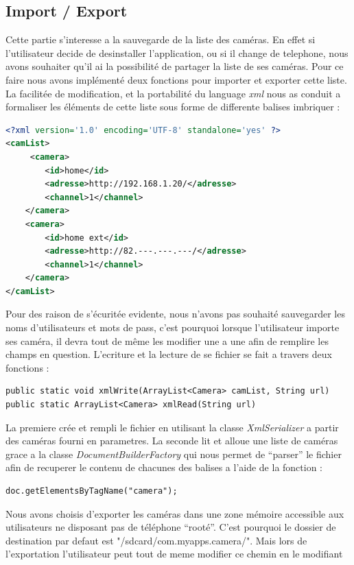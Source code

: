 \subsection{Import / Export}
Cette partie s'interesse a la sauvegarde de la liste des caméras. En effet si
l'utilisateur decide de desinstaller l'application, ou si il change de
telephone, nous avons souhaiter qu'il ai la possibilité de partager la liste de
ses caméras. Pour ce faire nous avons implémenté deux fonctions pour importer et
exporter cette liste.\newline
La facilitée de modification, et la portabilité du language \textit{xml} nous as
conduit a formaliser les éléments de cette liste sous forme de differente
balises imbriquer :
\begin{lstlisting}[language=XML, format=XML]
<?xml version='1.0' encoding='UTF-8' standalone='yes' ?> 
<camList>
   	 <camera> 
   		<id>home</id>
  		<adresse>http://192.168.1.20/</adresse> 
  		<channel>1</channel> 
  	</camera> 
  	<camera> 
   		<id>home ext</id>
  		<adresse>http://82.---.---.---/</adresse> 
  		<channel>1</channel> 
  	</camera> 
</camList>
\end{lstlisting}
Pour des raison de s'écuritée evidente, nous n'avons pas souhaité sauvegarder
les noms d'utilisateurs et mots de pass, c'est pourquoi lorsque l'utilisateur
importe ses caméra, il devra tout de même les modifier une a une afin de
remplire les champs en question.\newline
\indent L'ecriture et la lecture de se fichier se fait a travers deux fonctions
:
\begin{lstlisting}
public static void xmlWrite(ArrayList<Camera> camList, String url)
public static ArrayList<Camera> xmlRead(String url)
\end{lstlisting}
La premiere crée et rempli le fichier en utilisant la classe
\textit{XmlSerializer} a partir des caméras fourni en parametres.
La seconde lit et alloue une liste de caméras grace a la classe
\textit{DocumentBuilderFactory} qui nous permet de ``parser'' le fichier afin de
recuperer le contenu de chacunes des balises a l'aide de la fonction :
\begin{lstlisting}
doc.getElementsByTagName("camera");
\end{lstlisting}
\indent Nous avons choisis d'exporter les caméras dans une zone mémoire
accessible aux utilisateurs ne disposant pas de téléphone ``rooté''. C'est pourquoi le dossier
de destination par defaut est "/sdcard/com.myapps.camera/". Mais lors de
l'exportation l'utilisateur peut tout de meme modifier ce chemin en le modifiant
